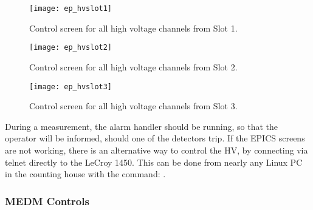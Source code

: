 {{\begin{figure}[bht]
    \begin{center}
        \texttt{[image: ep\_hvslot1]}
    \end{center}
    \caption[eP: HV Screen for Slot 1]{
	    Control screen for all high voltage channels from Slot 1.
            }
    \label{fig:ep_hvslot1} 
 \end{figure}  

\begin{figure}[bht]
    \begin{center}
        \texttt{[image: ep\_hvslot2]}
    \end{center}
    \caption[eP: HV Screen for Slot 2]{
	    Control screen for all high voltage channels from Slot 2.
            }
    \label{fig:ep_hvslot2} 
 \end{figure}  


 \begin{figure}[bht]
    \begin{center}
        \texttt{[image: ep\_hvslot3]}
    \end{center}
    \caption[eP: HV Screen for Slot 3]{
	    Control screen for all high voltage channels from Slot 3.
            }
    \label{fig:ep_hvslot3} 
 \end{figure}
}

During a measurement, the alarm handler should be running, so that the 
operator will be informed, should one of the detectors trip. 
If the EPICS screens are not working, there is an alternative way to 
control the HV, by connecting via telnet directly to the LeCroy 1450.
This can be done from nearly any Linux PC in the counting house with the 
command: .

\clearpage

\subsubsection{MEDM Controls}
\label{sec:ep_medm}

}
